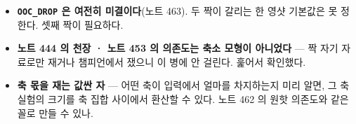 \documentclass[11pt]{article}
\begin{document}
\begin{itemize}
\item \textbf{\texttt{OOC\_DROP} 은 여전히 미결이다}(노트 463). 두 짝이
갈리는 한 영샷 기본값은 못 정한다. 셋째 짝이 필요하다.
\item \textbf{노트 444 의 천장 · 노트 453 의 의존도는 축소 모형이
아니었다} --- 짝 자기 자료로만 재거나 챔피언에서 쟀으니 이 병에 안
걸린다. 훑어서 확인했다.
\item \textbf{축 몫을 재는 값싼 자} --- 어떤 축이 입력에서 얼마를
차지하는지 미리 알면, 그 축 실험의 크기를 축 집합 사이에서 환산할 수
있다. 노트 462 의 원핫 의존도와 같은 꼴로 만들 수 있나.
\end{itemize}
\end{document}
